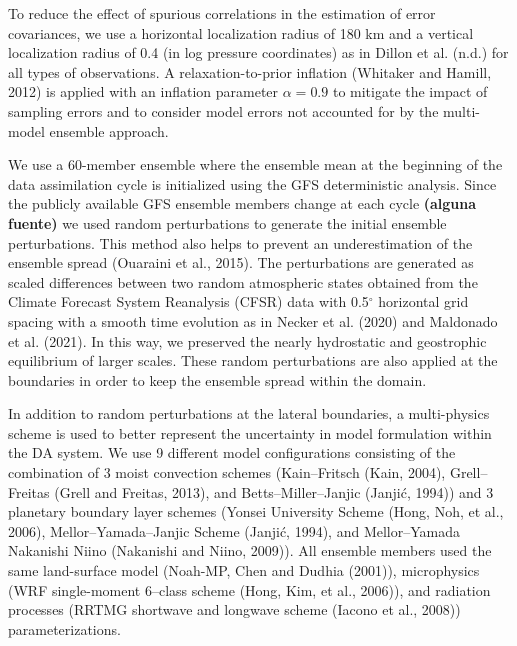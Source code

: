 \documentclass[final,5p,times,twocolumn,authoryear]{elsarticle} %
\begin{document}
To reduce the effect of spurious correlations in the estimation of error covariances, we use a horizontal localization radius of 180 km and a vertical localization radius of 0.4 (in log pressure coordinates) as in Dillon et al. (n.d.) for all types of observations.
A relaxation-to-prior inflation (Whitaker and Hamill, 2012) is applied with an inflation parameter \(\alpha=0.9\) to mitigate the impact of sampling errors and to consider model errors not accounted for by the multi-model ensemble approach.

We use a 60-member ensemble where the ensemble mean at the beginning of the data assimilation cycle is initialized using the GFS deterministic analysis. Since the publicly available GFS ensemble members change at each cycle \textbf{(alguna fuente)} we used random perturbations to generate the initial ensemble perturbations. This method also helps to prevent an underestimation of the ensemble spread (Ouaraini et al., 2015). The perturbations are generated as scaled differences between two random atmospheric states obtained from the Climate Forecast System Reanalysis (CFSR) data with 0.5\(^{\circ}\) horizontal grid spacing with a smooth time evolution as in Necker et al. (2020) and Maldonado et al. (2021). In this way, we preserved the nearly hydrostatic and geostrophic equilibrium of larger scales. These random perturbations are also applied at the boundaries in order to keep the ensemble spread within the domain.

In addition to random perturbations at the lateral boundaries, a multi-physics scheme is used to better represent the uncertainty in model formulation within the DA system. We use 9 different model configurations consisting of the combination of 3 moist convection schemes (Kain--Fritsch (Kain, 2004), Grell--Freitas (Grell and Freitas, 2013), and Betts--Miller--Janjic (Janjić, 1994)) and 3 planetary boundary layer schemes (Yonsei University Scheme (Hong, Noh, et al., 2006), Mellor--Yamada--Janjic Scheme (Janjić, 1994), and Mellor--Yamada Nakanishi Niino (Nakanishi and Niino, 2009)). All ensemble members used the same land-surface model (Noah-MP, Chen and Dudhia (2001)), microphysics (WRF single-moment 6--class scheme (Hong, Kim, et al., 2006)), and radiation processes (RRTMG shortwave and longwave scheme (Iacono et al., 2008)) parameterizations.
\end{document}
